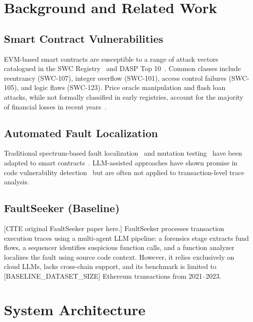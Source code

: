 \documentclass[conference]{IEEEtran}
\begin{document}
\section{Background and Related Work}
\label{sec:background}

\subsection{Smart Contract Vulnerabilities}
EVM-based smart contracts are susceptible to a range of attack vectors
catalogued in the SWC Registry~\cite{swcregistry} and DASP Top
10~\cite{dasp2018}. Common classes include reentrancy (SWC-107),
integer overflow (SWC-101), access control failures (SWC-105),
and logic flaws (SWC-123).
Price oracle manipulation and flash loan attacks, while not formally
classified in early registries, account for the majority of financial
losses in recent years~\cite{wu2021defiranger}.

\subsection{Automated Fault Localization}
Traditional spectrum-based fault localization~\cite{abreu2006accuracy}
and mutation testing~\cite{jia2011analysis} have been adapted to
smart contracts~\cite{li2022smartfl}.
LLM-assisted approaches have shown promise in code vulnerability
detection~\cite{chen2023chatgpt} but are often not applied to
transaction-level trace analysis.

\subsection{FaultSeeker (Baseline)}
[CITE original FaultSeeker paper here.]
FaultSeeker processes transaction execution traces using a multi-agent
LLM pipeline: a forensics stage extracts fund flows, a sequencer
identifies suspicious function calls, and a function analyzer
localizes the fault using source code context.
However, it relies exclusively on cloud LLMs, lacks cross-chain
support, and its benchmark is limited to [BASELINE\_DATASET\_SIZE] Ethereum
transactions from 2021--2023.


\section{System Architecture}
\label{sec:architecture}
\end{document}
